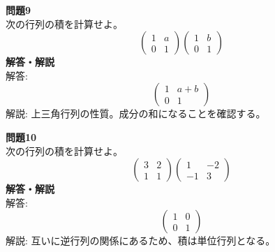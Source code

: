 \documentclass[a4paper,dvipdfmx]{jsarticle}
\begin{document}
\textbf{問題9}\\
次の行列の積を計算せよ。
$$ \begin{pmatrix} 1 & a \\ 0 & 1 \end{pmatrix} \begin{pmatrix} 1 & b \\ 0 & 1 \end{pmatrix} $$
\textbf{解答・解説}\\
解答: $$ \begin{pmatrix} 1 & a+b \\ 0 & 1 \end{pmatrix} $$
解説: 上三角行列の性質。成分の和になることを確認する。

\textbf{問題10}\\
次の行列の積を計算せよ。
$$ \begin{pmatrix} 3 & 2 \\ 1 & 1 \end{pmatrix} \begin{pmatrix} 1 & -2 \\ -1 & 3 \end{pmatrix} $$
\textbf{解答・解説}\\
解答: $$ \begin{pmatrix} 1 & 0 \\ 0 & 1 \end{pmatrix} $$
解説: 互いに逆行列の関係にあるため、積は単位行列となる。
\end{document}

